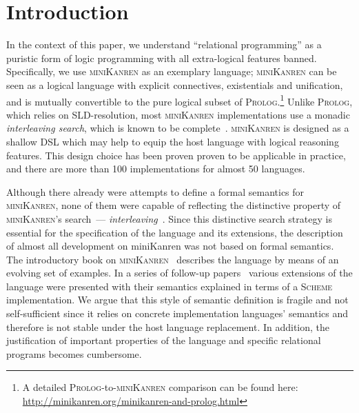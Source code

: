\section{Introduction}

In the context of this paper, we understand ``relational programming'' as a puristic form of logic programming with all extra-logical
features banned. Specifically, we use \textsc{miniKanren} as an exemplary language; \textsc{miniKanren} can be seen as
a logical language with explicit connectives, existentials and unification, and is mutually convertible to the pure logical subset of
\textsc{Prolog}.\footnote{A detailed \textsc{Prolog}-to-\textsc{miniKanren} comparison can be found here: \url{http://minikanren.org/minikanren-and-prolog.html}}
Unlike \textsc{Prolog}, which relies on SLD-resolution, most \textsc{miniKanren} implementations use a monadic \emph{interleaving
search}, which is known to be complete~\cite{SmallEmbedding}.
\textsc{miniKanren} is designed as a shallow DSL which may help to equip the host language with logical reasoning features. This
design choice has been proven proven to be applicable in practice, and there are more than 100 implementations for almost 50 languages.

Although there already were attempts to define a formal semantics for \textsc{miniKanren}, none of them were capable of reflecting the distinctive property of \textsc{miniKanren}'s search~--- \emph{interleaving}~\cite{Search}.
Since this distinctive search strategy is essential for the specification of the language and its extensions, the description of almost all development on miniKanren was not based on formal semantics.
The introductory book on \textsc{miniKanren}~\cite{TRS} describes the language by means of an evolving set of examples. In a
series of follow-up papers~\cite{MicroKanren,CKanren,CKanren1,AlphaKanren,2016,Guided} various extensions of the language were presented with
their semantics explained in terms of a \textsc{Scheme} implementation. We argue that this style of semantic definition is
fragile and not self-sufficient since it relies on concrete implementation languages' semantics and therefore is not stable under the host language replacement.
In addition, the justification of important properties of the language and specific relational programs becomes cumbersome.

\begin{comment}
There were some previous attempts to define a formal semantics for \textsc{miniKanren}. In~\cite{MechanisingMiniKanren} formal definitions
for denotational and non-deterministic operational semantics were given and the soundness result has been proven proven; the development was mechanized in HOL. 
\cite{RelConversion} presented a variant of nondeterministic operational semantics, and~\cite{DivTest} used another variant of finite-set semantics.
None of the previous approaches were capable of reflecting the distinctive property of \textsc{miniKanren}'s search~--- \emph{interleaving}~\cite{Search},
thus deviating from the conventional understanding of the language.
\end{comment}

